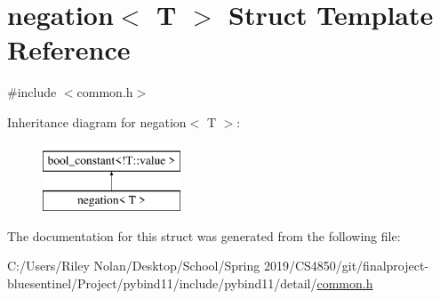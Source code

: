 \hypertarget{structnegation}{}\section{negation$<$ T $>$ Struct Template Reference}
\label{structnegation}


{\ttfamily \#include $<$common.\+h$>$}

Inheritance diagram for negation$<$ T $>$\+:\begin{figure}[H]
\begin{center}
\leavevmode
\includegraphics[height=2.000000cm]{structnegation}
\end{center}
\end{figure}


The documentation for this struct was generated from the following file\+:\begin{DoxyCompactItemize}
\item 
C\+:/\+Users/\+Riley Nolan/\+Desktop/\+School/\+Spring 2019/\+C\+S4850/git/finalproject-\/bluesentinel/\+Project/pybind11/include/pybind11/detail/\mbox{\hyperlink{detail_2common_8h}{common.\+h}}\end{DoxyCompactItemize}
